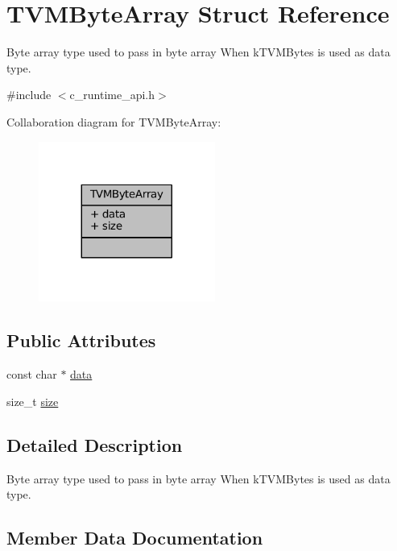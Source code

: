 \hypertarget{structTVMByteArray}{}\section{T\+V\+M\+Byte\+Array Struct Reference}
\label{structTVMByteArray}


Byte array type used to pass in byte array When k\+T\+V\+M\+Bytes is used as data type.  




{\ttfamily \#include $<$c\+\_\+runtime\+\_\+api.\+h$>$}



Collaboration diagram for T\+V\+M\+Byte\+Array\+:
\nopagebreak
\begin{figure}[H]
\begin{center}
\leavevmode
\includegraphics[width=164pt]{structTVMByteArray__coll__graph}
\end{center}
\end{figure}
\subsection*{Public Attributes}
\begin{DoxyCompactItemize}
\item 
const char $\ast$ \hyperlink{structTVMByteArray_ab124e3227a75e0e4d55452f675f4fde1}{data}
\item 
size\+\_\+t \hyperlink{structTVMByteArray_a86d8e8341ce407b7d9374d887143e476}{size}
\end{DoxyCompactItemize}


\subsection{Detailed Description}
Byte array type used to pass in byte array When k\+T\+V\+M\+Bytes is used as data type. 

\subsection{Member Data Documentation}
